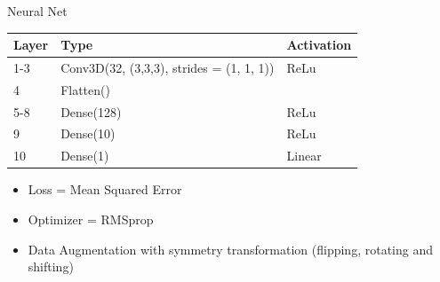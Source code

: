 \documentclass[10pt]{beamer}
\begin{document}
\begin{frame}{Neural Net}
  \centering
  \begin{tabular}{l|l|l}
    Layer & Type                                & Activation \\ \hline
    1-3     & Conv3D(32, (3,3,3), strides = (1, 1, 1)) & ReLu       \\
    4     & Flatten()                           &            \\
    5-8   & Dense(128)                          & ReLu       \\
    9     & Dense(10)                           & ReLu       \\
    10     & Dense(1)                            & Linear    
  \end{tabular}
  \begin{itemize}
  \item Loss = Mean Squared Error
  \item Optimizer = RMSprop
  \item Data Augmentation with symmetry transformation (flipping, rotating and shifting)
  \end{itemize}
\end{frame}
\end{document}
